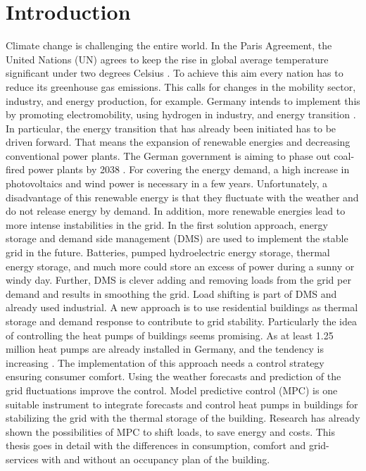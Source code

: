 \chapter{Introduction}
\label{ch:introduction}
Climate change is challenging the entire world. In the Paris Agreement, the United Nations (UN) agrees to keep the rise in global average temperature significant under two degrees Celsius \cite{UnitedNations.2015}. To achieve this aim every nation has to reduce its greenhouse gas emissions. This calls for changes in the mobility sector, industry, and energy production, for example. Germany intends to implement this by promoting electromobility, using hydrogen in industry, and energy transition \cite{Deutschlandfunk.24.06.2021}. In particular, the energy transition that has already been initiated has to be driven forward. That means the expansion of renewable energies and decreasing conventional power plants. The German government is aiming to phase out coal-fired power plants by 2038 \cite{bundesregierung.2021}. For covering the energy demand, a high increase in photovoltaics and wind power is necessary in a few years. 
\newline
Unfortunately, a disadvantage of this renewable energy is that they fluctuate with the weather and do not release energy by demand. In addition, more renewable energies lead to more intense instabilities in the grid. In the first solution approach, energy storage and demand side management (DMS) are used to implement the stable grid in the future. Batteries, pumped hydroelectric energy storage, thermal energy storage, and much more could store an excess of power during a sunny or windy day. Further, DMS is clever adding and removing loads from the grid per demand and results in smoothing the grid. Load shifting is part of DMS \cite{Gellings.1985} and already used industrial. A new approach is to use residential buildings as thermal storage and demand response to contribute to grid stability. Particularly the idea of controlling the heat pumps of buildings seems promising. As at least 1.25 million heat pumps are already installed in Germany, and the tendency is increasing \cite{BMW.2021}.
\newline
The implementation of this approach needs a control strategy ensuring consumer comfort. Using the weather forecasts and prediction of the grid fluctuations improve the control. Model predictive control (MPC) is one suitable instrument to integrate forecasts and control heat pumps in buildings for stabilizing the grid with the thermal storage of the building. Research has already shown the possibilities of MPC to shift loads, to save energy and costs. This thesis goes in detail with the differences in consumption, comfort and grid-services with and without an occupancy plan of the building.

